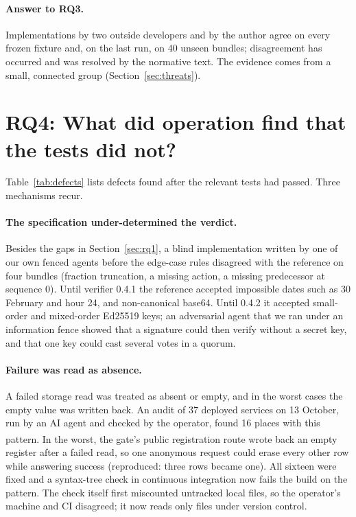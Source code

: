 \documentclass[11pt,a4paper]{article}
\newcommand{\priv}{\textsuperscript{\textdagger}}
\begin{document}
\paragraph{Answer to RQ3.} Implementations by two outside developers and by the author agree on every frozen fixture and, on the last run, on 40 unseen bundles; disagreement has occurred and was resolved by the normative text. The evidence comes from a small, connected group (Section~\ref{sec:threats}).

\section{RQ4: What did operation find that the tests did not?}\label{sec:rq4}

Table~\ref{tab:defects} lists defects found after the relevant tests had passed. Three mechanisms recur.

\paragraph{The specification under-determined the verdict.} Besides the gaps in Section~\ref{sec:rq1}, a blind implementation written by one of our own fenced agents before the edge-case rules disagreed with the reference on four bundles (fraction truncation, a missing action, a missing predecessor at sequence 0). Until verifier 0.4.1 the reference accepted impossible dates such as 30 February and hour 24, and non-canonical base64. Until 0.4.2 it accepted small-order and mixed-order Ed25519 keys; an adversarial agent that we ran under an information fence showed that a signature could then verify without a secret key, and that one key could cast several votes in a quorum.

\paragraph{Failure was read as absence.} A failed storage read was treated as absent or empty, and in the worst cases the empty value was written back. An audit of 37 deployed services on 13 October, run by an AI agent and checked by the operator, found 16 places with this pattern\priv. In the worst, the gate's public registration route wrote back an empty register after a failed read, so one anonymous request could erase every other row while answering success (reproduced: three rows became one). All sixteen were fixed and a syntax-tree check in continuous integration now fails the build on the pattern. The check itself first miscounted untracked local files, so the operator's machine and CI disagreed; it now reads only files under version control.
\end{document}
